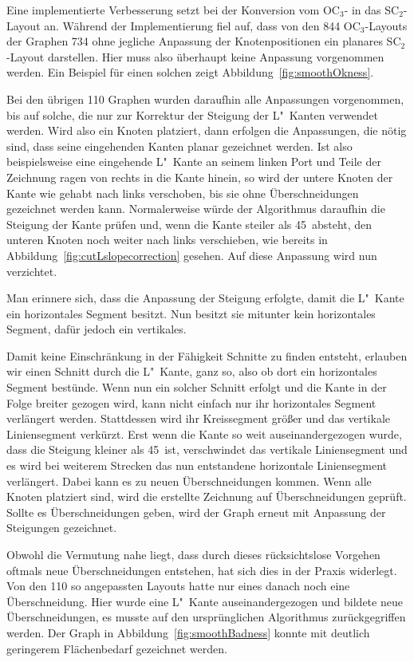 \documentclass[a4paper]{scrreprt}
\theoremstyle{definition}
\begin{document}
Eine implementierte Verbesserung setzt bei der Konversion vom OC$_3$- in das SC$_2$-Layout an. Während der Implementierung fiel auf, dass von den 844 OC$_3$-Layouts der Graphen 734 ohne jegliche Anpassung der Knotenpositionen ein planares SC$_2$-Layout darstellen. Hier muss also überhaupt keine Anpassung vorgenommen werden. Ein Beispiel für einen solchen zeigt Abbildung~\ref{fig:smoothOkness}.

Bei den übrigen 110 Graphen wurden daraufhin alle Anpassungen vorgenommen, bis auf solche, die nur zur Korrektur der Steigung der L"~Kanten verwendet werden. Wird also ein Knoten platziert, dann erfolgen die Anpassungen, die nötig sind, dass seine eingehenden Kanten planar gezeichnet werden. Ist also beispielsweise eine eingehende L"~Kante an seinem linken Port und Teile der Zeichnung ragen von rechts in die Kante hinein, so wird der untere Knoten der Kante wie gehabt nach links verschoben, bis sie ohne Überschneidungen gezeichnet werden kann. Normalerweise würde der Algorithmus daraufhin die Steigung der Kante prüfen und, wenn die Kante steiler als 45\textdegree\ absteht, den unteren Knoten noch weiter nach links verschieben, wie bereits in Abbildung~\ref{fig:cutLslopecorrection} gesehen. Auf diese Anpassung wird nun verzichtet. 

Man erinnere sich, dass die Anpassung der Steigung erfolgte, damit die L"~Kante ein horizontales Segment besitzt. Nun besitzt sie mitunter kein horizontales Segment, dafür jedoch ein vertikales.

Damit keine Einschränkung in der Fähigkeit Schnitte zu finden entsteht, erlauben wir einen Schnitt durch die L"~Kante, ganz so, also ob dort ein horizontales Segment bestünde. Wenn nun ein solcher Schnitt erfolgt und die Kante in der Folge breiter gezogen wird, kann nicht einfach nur ihr horizontales Segment verlängert werden. Stattdessen wird ihr Kreissegment größer und das vertikale Liniensegment verkürzt. Erst wenn die Kante so weit auseinandergezogen wurde, dass die Steigung kleiner als 45\textdegree\ ist, verschwindet das vertikale Liniensegment und es wird bei weiterem Strecken das nun entstandene horizontale Liniensegment verlängert. Dabei kann es zu neuen Überschneidungen kommen. Wenn alle Knoten platziert sind, wird die erstellte Zeichnung auf Überschneidungen geprüft. Sollte es Überschneidungen geben, wird der Graph erneut mit Anpassung der Steigungen gezeichnet.

Obwohl die Vermutung nahe liegt, dass durch dieses rücksichtslose Vorgehen oftmals neue Überschneidungen entstehen, hat sich dies in der Praxis widerlegt. Von den 110 so angepassten Layouts hatte nur eines danach noch eine Überschneidung. Hier wurde eine L"~Kante auseinandergezogen und bildete neue Überschneidungen, es musste auf den ursprünglichen Algorithmus zurückgegriffen werden. Der Graph in Abbildung~\ref{fig:smoothBadness} konnte mit deutlich geringerem Flächenbedarf gezeichnet werden.
\end{document}
